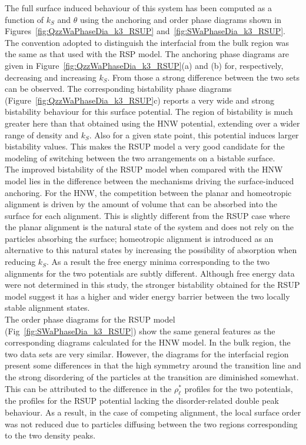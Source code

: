 The full surface induced behaviour of this system has been computed as a function of $k_S$ and 
$\theta$ using the anchoring and order phase diagrams shown in 
Figures~\ref{fig:QzzWaPhaseDia_k3_RSUP} and~\ref{fig:SWaPhaseDia_k3_RSUP}. 
The convention adopted to distinguish the interfacial 
from the bulk region was the same as that used with the RSP model.
%
The anchoring phase diagrams are given in Figure~\ref{fig:QzzWaPhaseDia_k3_RSUP}(a) 
and (b) for, respectively, decreasing and increasing $k_S$. From those
a strong difference between the two sets can be observed. The corresponding bistability 
phase diagrams (Figure~\ref{fig:QzzWaPhaseDia_k3_RSUP}c)  reports a very wide and strong 
bistability behaviour for this surface potential.  The region of bistability is much greater
here than that obtained using the HNW potential, extending over a wider range of density 
and $k_S$. Also for a given state point, this potential induces larger bistability values. 
This makes the RSUP model a very good candidate for the modeling of switching between the 
two arrangements on a bistable surface.\\
%
The improved bistability of the RSUP model when compared with the HNW
model lies in the difference between the mechanisms driving the surface-induced anchoring. For the
HNW, the competition between the planar and homeotropic alignment is driven by the
amount of volume that can be absorbed into the surface for each alignment. 
This is slightly different from the RSUP case where the planar alignment is the natural 
state of the system and does not rely on the particles absorbing the surface; homeotropic 
alignment is introduced as an alternative to this natural states by increasing the possibility 
of absorption when reducing $k_S$. 
As a result the free energy minima corresponding to the two alignments for the two potentials 
are subtly different. Although free energy data were not determined in this study, 
the stronger bistability obtained for the RSUP model suggest it has a higher 
and wider energy barrier between the two locally stable  
alignment states.\\


The order phase diagrams for the RSUP model (Fig~\ref{fig:SWaPhaseDia_k3_RSUP}) show the 
same general features as
the corresponding diagrams calculated for the HNW model. In the bulk region, the two data
sets are very similar. However, the diagrams for the interfacial region present some differences
in that the high symmetry around the transition line and the strong disordering of
the particles at the transition are diminished somewhat. This can be attributed to the
difference in the $\rho^{*}_\ell$ profiles for the two potentials, the profiles for the 
RSUP potential lacking the disorder-related
double peak behaviour. As a result, in the case of competing alignment, the local surface
order was not reduced due to particles diffusing between the two regions corresponding to the two
density peaks.\\


